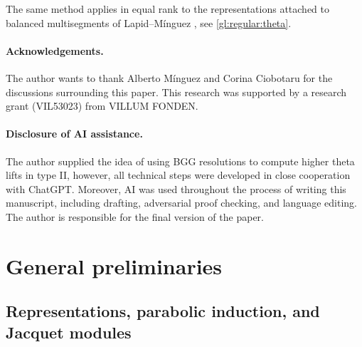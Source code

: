 \documentclass[10pt,a4paper]{article}
\theoremstyle{definition}
\theoremstyle{remark}
\numberwithin{equation}{section}
\begin{document}
The same method applies in equal rank to the representations
attached to balanced multisegments of Lapid--M\'inguez
\cite[\S6]{RegularLM2018}, see \cref{gl:regular:theta}.

\paragraph{Acknowledgements.}
The author wants to thank Alberto M\'inguez and Corina Ciobotaru for the discussions surrounding this paper. This research was supported by a research grant (VIL53023) from VILLUM FONDEN.

\paragraph{Disclosure of AI assistance.}
The author supplied the idea of using BGG resolutions to compute
higher theta lifts in type II, however, all technical steps were developed in close cooperation with ChatGPT. Moreover, AI was used throughout the process of writing this manuscript, including drafting, adversarial proof checking, and language editing.
The author is responsible for the final version of the paper.

\section{General preliminaries}\label{sec:general-preliminaries}

\subsection{Representations, parabolic induction, and Jacquet modules}
\label{prelim:conventions}
\end{document}
